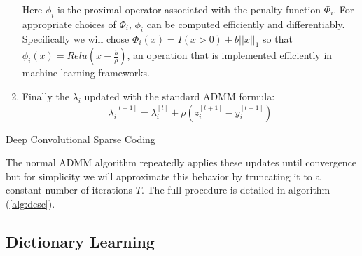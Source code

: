 \begin{enumerate}
  Here $\phi_i$ is the proximal operator associated with the penalty function $\Phi_i$. For appropriate choices of $\Phi_i$, $\phi_i$ can be computed efficiently and differentiably. Specifically we will chose $\Phi_i(x) = I(x > 0) + b\left||x\right||_1$ so that $\phi_i(x) = Relu(x - \frac{b}{\rho})$, an operation that is implemented efficiently in machine learning frameworks.
\item Finally the $\lambda_i$ updated with the standard ADMM formula:
  \begin{equation}
    \label{eq:lupdate}
    \lambda_i^{[t+1]} = \lambda_i^{[t]} + \rho(z_i^{[t+1]} - y_i^{[t+1]})
  \end{equation}
\end{enumerate}
\begin{algorithm}
  \caption{Deep Convolutional Sparse Coding}
  \label{alg:dcsc}
\end{algorithm}

The normal ADMM algorithm repeatedly applies these updates until convergence but for simplicity we will approximate this behavior by truncating it to a constant number of iterations $T$. The full procedure is detailed in algorithm (\ref{alg:dcsc}).

\subsection{Dictionary Learning}
\label{sec:dictionary-learning}

